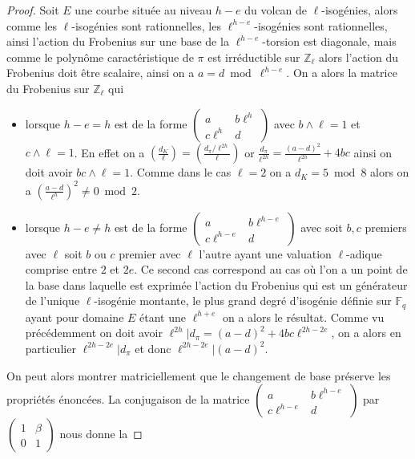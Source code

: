 \documentclass[10pt,a4paper]{book}
\theoremstyle{plain}
\theoremstyle{definition}
\theoremstyle{definition}
\theoremstyle{definition}
\theoremstyle{definition}
\theoremstyle{remark}
\theoremstyle{remark}
\theoremstyle{definition}
\begin{document}
\begin{proof}
Soit $E$ une courbe située au niveau $h-e$ du volcan de $\ell$-isogénies, alors
comme les $\ell$-isogénies sont rationnelles, les $\ell^{h-e}$-isogénies 
sont rationnelles, ainsi l'action du Frobenius sur une base de la 
$\ell^{h-e}$-torsion est diagonale, mais comme le polynôme caractéristique de 
$\pi$ est irréductible sur $\mathbb{Z}_{\ell}$ alors l'action du Frobenius doit
être scalaire, ainsi on a $a=d \bmod \ell^{h-e}$.
On a alors la matrice du Frobenius sur $\mathbb{Z}_{\ell}$ qui  
\begin{itemize}
\item lorsque $h-e=h$ est de la forme $\left ( \begin{smallmatrix}a & b\ell^{h}\\c\ell^{h} & d
\end{smallmatrix}\right )$ avec $b \wedge \ell=1$ et $c \wedge \ell=1$. En 
effet on a $\left(\frac{d_K}{\ell}\right)=\left(\frac{d_{\pi}/\ell^{2h}}{\ell}
\right)$ or $\frac{d_{\pi}}{\ell^{2h}}=\frac{(a-d)^2}{\ell^{2h}}+4bc$ ainsi on 
doit avoir $bc \wedge \ell=1$. Comme dans le cas $\ell=2$ on a $d_K=5 \bmod 8$ 
alors on a $(\frac{a-d}{\ell^{h}})^2 \neq 0 \bmod 2$.
\item lorsque $h-e \neq h$ est de la forme  $\left ( \begin{smallmatrix}a & 
b\ell^{h-e}\\ c\ell^{h-e}  & d \end{smallmatrix}\right )$ avec soit $b, c$ 
premiers avec $\ell$ soit $b$ ou $c$ premier avec $\ell$ l'autre ayant une 
valuation $\ell$-adique comprise entre $2$ et $2e$. Ce second cas correspond au
cas où l'on a un point de la base dans laquelle est exprimée l'action du 
Frobenius qui est un générateur de l'unique $\ell$-isogénie montante, le plus 
grand degré d'isogénie définie sur $\mathbb{F}_q$ ayant pour domaine $E$ étant 
une $\ell^{h+e}$ on a alors le résultat. Comme vu précédemment on doit avoir 
$\ell^{2h} | d_{\pi}=(a-d)^2+4bc\ell^{2h-2e}$, on a alors en particulier 
$\ell^{2h-2e} | d_{\pi}$ et donc $\ell^{2h-2e} | (a-d)^2$.
\end{itemize}
On peut alors montrer matriciellement que le changement de base préserve les 
propriétés énoncées. La conjugaison de la matrice $\left ( \begin{smallmatrix}a
& b\ell^{h-e}\\c\ell^{h-e} & d \end{smallmatrix}\right )$ par~$\left ( 
\begin{smallmatrix}1 & \beta \\0 & 1 \end{smallmatrix} \right )$ nous donne la

\end{proof}
\end{document}
